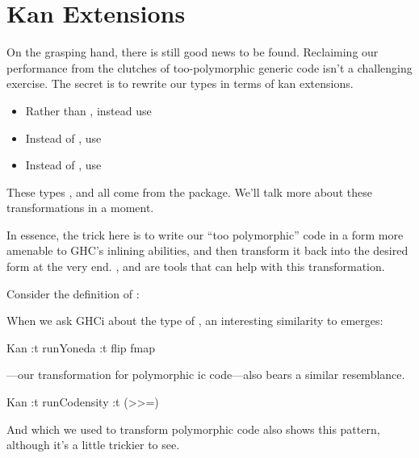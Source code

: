\documentclass[book.tex]{subfiles}
\begin{document}
\section{Kan Extensions}


On the grasping hand, there is still good news to be found. Reclaiming our
performance from the clutches of too-polymorphic generic code isn't a
challenging exercise. The secret is to rewrite our types in terms of kan
extensions.

\begin{itemize}
  \item{Rather than , instead use }
  \item{Instead of , use }
  \item{Instead of , use }
\end{itemize}

These types ,  and  all come from the
\cite{kan-extensions} package. We'll talk more about these
transformations in a moment.

In essence, the trick here is to write our ``too polymorphic'' code in a form
more amenable to GHC's inlining abilities, and then transform it back into the
desired form at the very end. ,  and  are
tools that can help with this transformation.

Consider the definition of :


When we ask GHCi about the type of , an interesting similarity to
 emerges:

\begin{dorepl}{Kan}
:t runYoneda
:t flip fmap
\end{dorepl}

---our transformation for polymorphic ic code---also
bears a similar resemblance.

\begin{dorepl}{Kan}
:t runCodensity
:t (>>=)
\end{dorepl}

And  which we used to transform polymorphic  code
also shows this pattern, although it's a little trickier to see.
\end{document}
